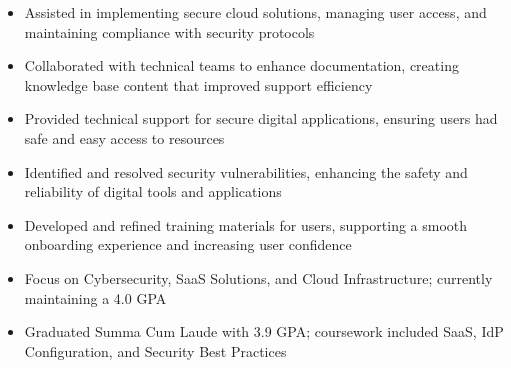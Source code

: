\par\smallskip
\noindent
\begin{minipage}{20cm}
  \begin{minipage}{9.75cm}
    \begin{itemize}
      \item Assisted in implementing secure cloud solutions, managing user access, and maintaining compliance with security protocols
      \item Collaborated with technical teams to enhance documentation, creating knowledge base content that improved support efficiency
      \item Provided technical support for secure digital applications, ensuring users had safe and easy access to resources
    \end{itemize}
  \end{minipage}
  \hfill
  \begin{minipage}{9.75cm}
    \begin{itemize}
      \item Identified and resolved security vulnerabilities, enhancing the safety and reliability of digital tools and applications
      \item Developed and refined training materials for users, supporting a smooth onboarding experience and increasing user confidence
    \end{itemize}
  \end{minipage}
\end{minipage}

\begin{itemize}
  \item Focus on Cybersecurity, SaaS Solutions, and Cloud Infrastructure; currently maintaining a 4.0 GPA
\end{itemize}
\divider

\begin{itemize}
  \item Graduated Summa Cum Laude with 3.9 GPA; coursework included SaaS, IdP Configuration, and Security Best Practices
\end{itemize}

\noindent
\begin{minipage}{20cm}
     
     
    
\end{minipage}


